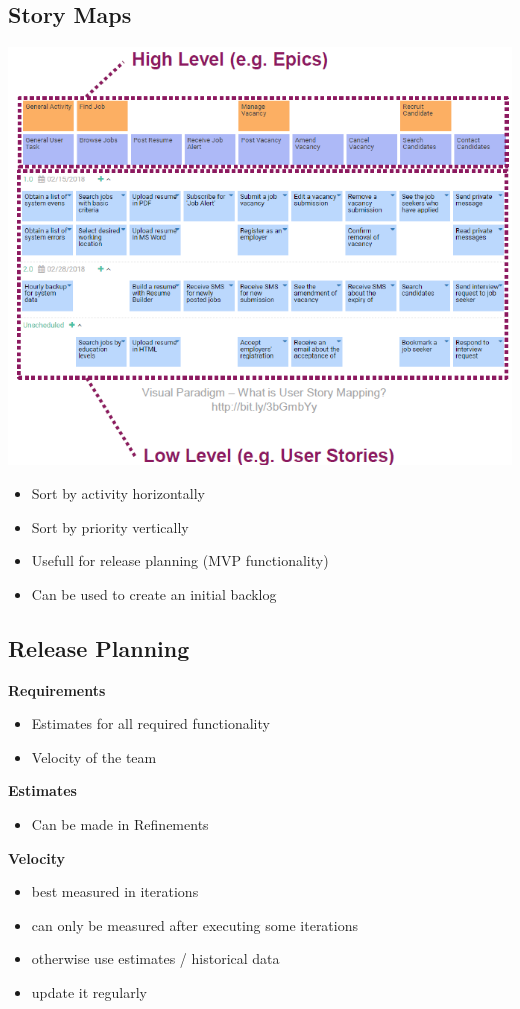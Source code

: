 \subsection{Story Maps}
\includegraphics[width=\linewidth]{../img/story_maps.png}
\begin{itemize}
    \item Sort by activity horizontally
    \item Sort by priority vertically
    \item Usefull for release planning (MVP functionality)
    \item Can be used to create an initial backlog
\end{itemize}

\subsection{Release Planning}
\textbf{Requirements}
\begin{itemize}
    \item Estimates for all required functionality
    \item Velocity of the team
\end{itemize}
\textbf{Estimates}
\begin{itemize}
    \item Can be made in Refinements
\end{itemize}
\textbf{Velocity}
\begin{itemize}
    \item best measured in iterations
    \item can only be measured after executing some iterations
    \item otherwise use estimates / historical data
    \item update it regularly
\end{itemize}

